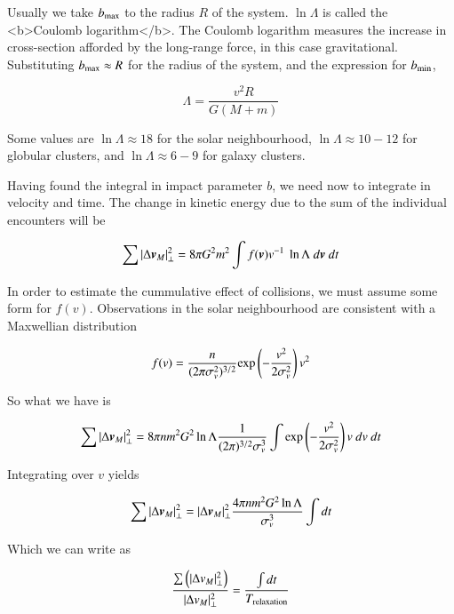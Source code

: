 Usually we take $b_{\rm max}$ to the radius $R$ of the system. $\ln \Lambda$ is called the <b>Coulomb logarithm</b>. The Coulomb logarithm measures the increase in cross-section afforded by the long-range force, in this case gravitational. Substituting $b_{\rm max}\approx R$ for the radius of the system, and the expression for $b_{\rm min}$, 

\begin{equation}
\Lambda = \frac{v^2 R}{G(M+m)}
\end{equation}


Some values are $\ln \Lambda \approx 18$ for the solar neighbourhood, $\ln \Lambda \approx 10-12$ for globular clusters, and $\ln \Lambda \approx 6-9$ for galaxy clusters. 


Having found the integral in impact parameter $b$, we need now to integrate in velocity and time. The change in kinetic energy due to the sum of the individual encounters will be  


\begin{equation}
\sum |\Delta {\boldsymbol{v}}_{M}|_\perp^2  = 8\pi G^2 m^2 \int f({\boldsymbol{v}}) v^{-1} \ \ln \Lambda \ d{\boldsymbol{v}} \ dt
\end{equation}

In order to estimate the cummulative effect of collisions, we must assume some form for $f(v)$. Observations in the solar neighbourhood are consistent with a Maxwellian distribution

\begin{equation}
f(v) = \frac{n}{(2\pi \sigma_v^2)^{3/2}} {\rm exp}\left(-\frac{v^2}{2\sigma_v^2}\right)v^2
\end{equation}

So what we have is 

\begin{equation}
\sum |\Delta {\boldsymbol{v}}_{M}|_\perp^2  = 8\pi nm^2 G^2 \ln \Lambda \frac{1}{(2\pi)^{3/2} \sigma_v^3} \int  {\rm exp}\left(-\frac{v^2}{2\sigma_v^2}\right)v \ dv \ dt
\end{equation}

Integrating over $v$ yields 

\begin{equation}
\sum |\Delta {\boldsymbol{v}}_{M}|_\perp^2  = |\Delta {\boldsymbol{v}}_{M}|_\perp^2 \frac{4\pi n m^2 G^2 \ln \Lambda}{\sigma_v^3} \int dt
\end{equation}


Which we can write as 

\begin{equation}
\frac{\sum \left(|\Delta v_{M}|_\perp^2\right)}{|\Delta v_{M}|_\perp^2} = \frac{\int dt}{T_{\rm relaxation}}
\end{equation}


